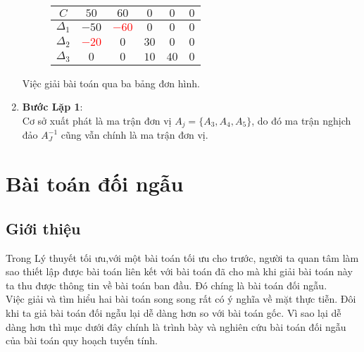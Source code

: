 \documentclass{article}
\begin{document}
\begin{enumerate}
\begin{figure}[H]
\begin{center}
\begin{tabular}{|c|c|c|c|c|c|}
                    \hline
                    $C$& 
                    \cellcolor[rgb]{0, .69, .941}$50$ & 
                    \cellcolor[rgb]{0, .69, .941}$60$ & 
                    \cellcolor[rgb]{0, .69, .941}$0$ & 
                    \cellcolor[rgb]{0, .69, .941}$0$ & 
                    \cellcolor[rgb]{0, .69, .941}$0$ \\
                    \hline
                    $\Delta_{1}$ & 
                    \cellcolor[rgb]{1, .753, .0}$-50$ & 
                    \cellcolor[rgb]{1, .753, .0}\textcolor{red}{$-60$} & 
                    \cellcolor[rgb]{1, .753, .0}$0$ & 
                    \cellcolor[rgb]{1, .753, .0}$0$ & 
                    \cellcolor[rgb]{1, .753, .0}$0$ \\
                    \hline
                    $\Delta_{2}$ & 
                    \cellcolor[rgb]{1, .753, .0}\textcolor{red}{$-20$} & 
                    \cellcolor[rgb]{1, .753, .0}$0$ & 
                    \cellcolor[rgb]{1, .753, .0}$30$ & 
                    \cellcolor[rgb]{1, .753, .0}$0$ & 
                    \cellcolor[rgb]{1, .753, .0}$0$ \\
                    \hline
                    $\Delta_{3}$ & 
                    \cellcolor[rgb]{1, .753, .0}$0$ & 
                    \cellcolor[rgb]{1, .753, .0}$0$ & 
                    \cellcolor[rgb]{1, .753, .0}$10$ & 
                    \cellcolor[rgb]{1, .753, .0}$40$ & 
                    \cellcolor[rgb]{1, .753, .0}$0$ \\
                    \hline
                \end{tabular}
            \end{center}  
        \end{figure}
        Việc giải bài toán qua ba bảng đơn hình. \\
            \item \textbf{Bước Lặp 1}: \\
            Cơ sở xuất phát là ma trận đơn vị $A_j=\{A_3,A_4,A_5\}$, do đó ma trận nghịch đảo $A_J^{-1}$ cũng vẫn chính là ma trận đơn vị.


                \end{enumerate}
\section{Bài toán đối ngẫu}
    \subsection{Giới thiệu}
        Trong Lý thuyết tối ưu,với một bài toán tối ưu cho trước, người ta quan tâm làm sao thiết lập được bài toán liên kết với bài toán đã cho mà khi giải bài toán này ta thu được thông tin về bài toán ban đầu. Đó chíng là bài toán đối ngẫu. \\
        Việc giải và tìm hiểu hai bài toán song song rất có ý nghĩa về mặt thực tiễn. Đôi khi ta giả bài toán đối ngẫu lại dễ dàng hơn so với bài toán gốc. Vì sao lại dễ dàng hơn thì mục dưới đây chính là trình bày và nghiên cứu bài toán đối ngẫu của bài toán quy hoạch tuyến tính.
\end{document}
